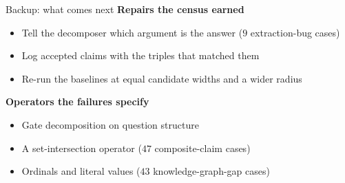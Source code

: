 \begin{frame}{Backup: what comes next}
  \bodyshift{4.5pt}
  \small\let\raggedright\agrraggedright
  \textbf{Repairs the census earned}
  \begin{itemize}\setlength{\itemsep}{0pt}\setlength{\parskip}{0pt}
    \item Tell the decomposer which argument is the answer ($9$
      extraction-bug cases)
    \item Log accepted claims with the triples that matched them
    \item Re-run the baselines at equal candidate widths and a wider radius
  \end{itemize}
  \textbf{Operators the failures specify}
  \begin{itemize}\setlength{\itemsep}{0pt}\setlength{\parskip}{0pt}
    \item Gate decomposition on question structure
    \item A set-intersection operator ($47$ composite-claim cases)
    \item Ordinals and literal values ($43$ knowledge-graph-gap cases)
  \end{itemize}
\end{frame}
